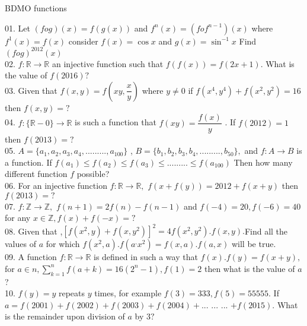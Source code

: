 \documentclass[a4paper,11pt]{article}
\begin{document}
\begin{center}
\begin{LARGE}
BDMO functions
\end{LARGE}
\end{center}

01. Let $(fog)(x) = f(g(x))$ and $f^{n}(x) = (fof^{n-1})(x)$ where $f^{1}(x)=f(x)$ consider $f(x)=\cos x$ and $g(x)=\sin^{-1}x$ Find $(fog)^{2012}(x)$\\

02. $f:\mathbb{R}\rightarrow \mathbb{R}$ an injective function such that $f(f(x))=f(2x+1)$. What is the value of $f(2016)?$\\

03. Given that $f(x,y) = f(xy,\dfrac{x}{y} )$ where $y\neq 0$ if $f(x^4,y^4)+f(x^2,y^2)=16$ then $ f(x,y) = ?$\\

04. $f:\{\mathbb{R}-0\} \to \mathbb{R}$ is such a function that $f(xy)=\dfrac{f(x)}{y}$ . If $f(2012)=1$ then $f(2013)=?$\\

05. $A=\{a_{1},a_{2},a_{3},a_{4},... ... ... , a_{100}\}$ ,  $B=\{b_{1},b_{2},b_{3},b_{4},... ... ... , b_{50}\},$ and $f:A \to B$ is a function. If $f(a_{1}) \le f(a_{2}) \le f(a_{3}) \le ... ... ... \le f(a_{100}) $ Then how many different function $f$ possible?\\

06. For an injective function $f:\mathbb{R} \to \mathbb{R},$  $f(x+f(y)) = 2012+ f(x+y)$ then $f(2013) = ?$\\

07. $f:\mathbb{Z} \to \mathbb{Z},$  $f(n+1) = 2f(n) - f(n-1)$ and $f(-4) = 20, f(-6) = 40$ for any $x \in \mathbb{Z}, f(x) + f(-x) = ?$\\

08. Given that ,$ [f(x^2,y)+f(x,y^2)]^2 = 4f(x^2,y^2).f(x,y) .$Find all the values of $a $ for which $f(x^2,a).f(a^,x^2) = f(x,a).f(a,x) $ will be true.\\

09. A function $f: \mathbb{R} \to \mathbb{R}$ is defined in such a way that $f(x).f(y)=f(x+y),$ for $a \in n , \sum\limits_{k=1}^{n} f(a+k) = 16(2^n -1), f(1)=2$ then what is the value of $a$?\\

10. $f(y)= y$ repeats $y$ times, for example $f(3) = 333, f(5) = 55555.$ If $ a = f(2001)+ f(2002)+f(2003) + f(2004)+ ...$ $...$ $...$ $+ f(2015).$ What is the remainder upon division of $a$ by $3?$\\
\end{document}
